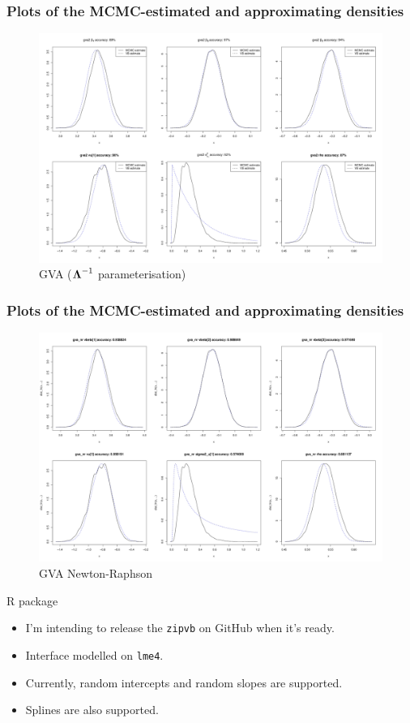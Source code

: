 \documentclass{beamer}
\begin{document}
\begin{frame}
	\frametitle{Plots of the MCMC-estimated and approximating densities}
	\begin{figure}
		\caption{GVA (${\boldsymbol \Lambda}^{-1}$ parameterisation)}
		\includegraphics[scale=0.15]{code/results/output_montage_application_gva2.png}
	\end{figure}
\end{frame}

\begin{frame}
	\frametitle{Plots of the MCMC-estimated and approximating densities}
	\begin{figure}
		\caption{GVA Newton-Raphson}
		\includegraphics[scale=0.15]{code/results/output_montage_application_gva_nr.png}
	\end{figure}
\end{frame}

\begin{frame}{R package}
	\begin{itemize}
		\item I'm intending to release the \texttt{zipvb} on GitHub when it's ready.
		\item Interface modelled on \texttt{lme4}.
		\item Currently, random intercepts and random slopes are supported.
		\item Splines are also supported.
	\end{itemize}	
\end{frame}
\end{document}
